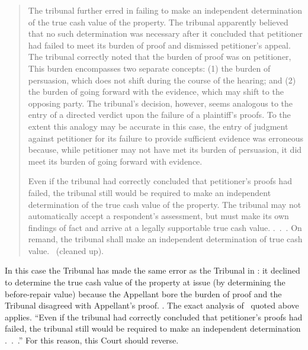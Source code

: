 \documentclass[12pt,\documentclassflag]{michiganCourtOfAppealsBrief}
\begin{document}
\begin{quotation}
	The tribunal further erred in failing to make an independent determination of the true cash value of the property. The tribunal apparently believed that no such determination was necessary after it concluded that petitioner had failed to meet its burden of proof and dismissed petitioner's appeal. The tribunal correctly noted that the burden of proof was on petitioner, This burden encompasses two separate concepts: (1) the burden of persuasion, which does not shift during the course of the hearing; and (2) the burden of going forward with the evidence, which may shift to the opposing party. The tribunal's decision, however, seems analogous to the entry of a directed verdict upon the failure of a plaintiff's proofs. To the extent this analogy may be accurate in this case, the entry of judgment against petitioner for its failure to provide sufficient evidence was erroneous because, while petitioner may not have met its burden of persuasion, it did meet its burden of going forward with evidence.
	
	Even if the tribunal had correctly concluded that petitioner's proofs had failed, the tribunal still would be required to make an independent determination of the true cash value of the property. The tribunal may not automatically accept a respondent's assessment, but must make its own findings of fact and arrive at a legally supportable true cash value. .~.~. On remand, the tribunal shall make an independent determination of true cash value. \ (cleaned up).
\end{quotation}

In this case the Tribunal has made the same error as the Tribunal in \cite[s]{Jones & Laughlin}: it declined to determine the true cash value of the property at issue (by determining the before-repair value) because the Appellant bore the burden of proof and the Tribunal disagreed with Appellant's proof. \reconsiderationDenied[2]. The exact analysis of \cite[s]{Jones & Laughlin}\ quoted above applies. ``Even if the tribunal had correctly concluded that petitioner's proofs had failed, the tribunal still would be required to make an independent determination .~.~.'' For this reason, this Court should reverse.

\end{document}
